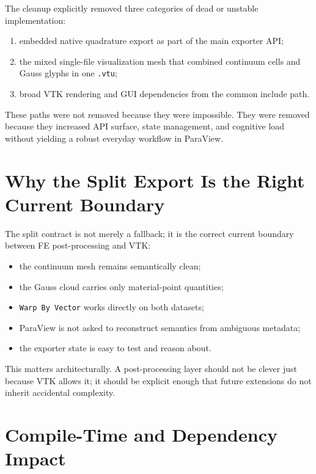 The cleanup explicitly removed three categories of dead or unstable
implementation:
\begin{enumerate}[nosep]
  \item embedded native quadrature export as part of the main exporter API;
  \item the mixed single-file visualization mesh that combined continuum cells
        and Gauss glyphs in one \texttt{.vtu};
  \item broad VTK rendering and GUI dependencies from the common include path.
\end{enumerate}

These paths were not removed because they were impossible.  They were removed
because they increased API surface, state management, and cognitive load
without yielding a robust everyday workflow in ParaView.


\section{Why the Split Export Is the Right Current Boundary}
\label{sec:vtk_cleanup_boundary}

The split contract is not merely a fallback; it is the correct current
boundary between FE post-processing and VTK:
\begin{itemize}[nosep]
  \item the continuum mesh remains semantically clean;
  \item the Gauss cloud carries only material-point quantities;
  \item \texttt{Warp By Vector} works directly on both datasets;
  \item ParaView is not asked to reconstruct semantics from ambiguous metadata;
  \item the exporter state is easy to test and reason about.
\end{itemize}

This matters architecturally.  A post-processing layer should not be clever
just because VTK allows it; it should be explicit enough that future extensions
do not inherit accidental complexity.


\section{Compile-Time and Dependency Impact}
\label{sec:vtk_cleanup_compiletime}

